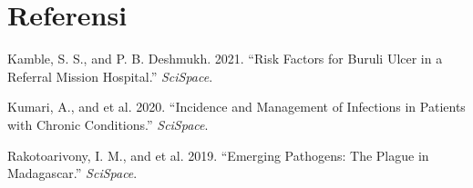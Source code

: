 \documentclass[
]{article}
\newlength{\cslhangindent}
\newlength{\cslentryspacingunit} %
\newenvironment{CSLReferences}[2] %
 {%
  \setlength{\parindent}{0pt}
  \ifodd #1
  \let\oldpar\par
  \def\par{\hangindent=\cslhangindent\oldpar}
  \fi
  \setlength{\parskip}{#2\cslentryspacingunit}
 }%
 {}
\begin{document}
\hypertarget{referensi}{%
\section*{Referensi}\label{referensi}}

\hypertarget{refs}{}
\begin{CSLReferences}{1}{0}
\leavevmode{}%
Kamble, S. S., and P. B. Deshmukh. 2021. {``Risk Factors for Buruli
Ulcer in a Referral Mission Hospital.''} \emph{SciSpace}.

\leavevmode{}%
Kumari, A., and et al. 2020. {``Incidence and Management of Infections
in Patients with Chronic Conditions.''} \emph{SciSpace}.

\leavevmode{}%
Rakotoarivony, I. M., and et al. 2019. {``Emerging Pathogens: The Plague
in Madagascar.''} \emph{SciSpace}.

\end{CSLReferences}
\end{document}
